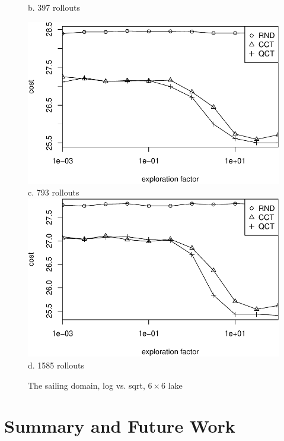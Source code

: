 \documentclass{article}
\begin{document}
\begin{figure}[t]
\begin{minipage}[b]{0.5\linewidth}
    b. 397 rollouts\\
  \end{minipage}
  \begin{minipage}[b]{0.5\linewidth}
    \centering
    \includegraphics[scale=0.45]{rcq-size=6-nsamples=793.pdf}\\
    c. 793 rollouts\\
    \vspace{1em}
    \includegraphics[scale=0.45]{rcq-size=6-nsamples=1585.pdf}\\
    d. 1585 rollouts\\
  \end{minipage}
  \caption{The sailing domain, log vs. sqrt, $6\times 6$ lake}
  \label{fig:sailing-rcq-vs-factor}
\end{figure}

\section{Summary and Future Work}
\label{sec:summary}
\end{document}
